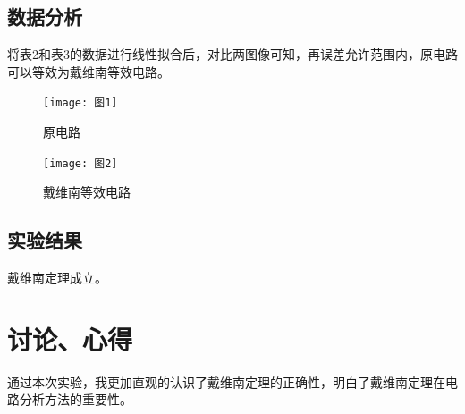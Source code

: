\documentclass{../source/Experiment}
\begin{document}
        \subsection{数据分析}
        将表2和表3的数据进行线性拟合后，对比两图像可知，再误差允许范围内，原电路可以等效为戴维南等效电路。
        \begin{figure}[htbp]          
            \begin{minipage}[t]{0.5\textwidth}
                \centering
                \texttt{[image: 图1]}
                \caption{原电路\label{fig:1}}
            \end{minipage}
            \qquad
            \begin{minipage}[t]{0.5\textwidth}
                \centering
                \texttt{[image: 图2]}
                \caption{戴维南等效电路\label{fig:2}}
            \end{minipage}
        \end{figure}
        \subsection{实验结果}
        戴维南定理成立。
    \section{讨论、心得}
            通过本次实验，我更加直观的认识了戴维南定理的正确性，明白了戴维南定理在电路分析方法的重要性。
\end{document}
